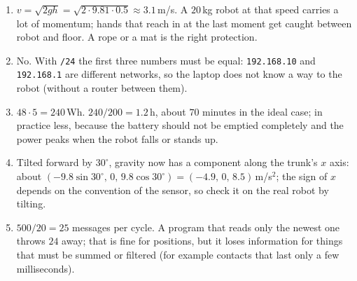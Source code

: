 \begin{enumerate}[label=\textbf{\ansnum.\arabic*}]
  \item $v=\sqrt{2gh}=\sqrt{2\cdot9.81\cdot0.5}\approx3.1$\,m/s. A $20$\,kg robot at that speed carries a lot of momentum; hands that reach in at the last moment get caught between robot and floor. A rope or a mat is the right protection.
  \item No. With \texttt{/24} the first three numbers must be equal: \texttt{192.168.10} and \texttt{192.168.1} are different networks, so the laptop does not know a way to the robot (without a router between them).
  \item $48\cdot5=240$\,Wh. $240/200=1.2$\,h, about $70$ minutes in the ideal case; in practice less, because the battery should not be emptied completely and the power peaks when the robot falls or stands up.
  \item Tilted forward by $30^\circ$, gravity now has a component along the trunk's $x$ axis: about $(-9.8\sin30^\circ,\,0,\,9.8\cos30^\circ)=(-4.9,\,0,\,8.5)$\,m/s$^2$; the sign of $x$ depends on the convention of the sensor, so check it on the real robot by tilting.
  \item $500/20=25$ messages per cycle. A program that reads only the newest one throws $24$ away; that is fine for positions, but it loses information for things that must be summed or filtered (for example contacts that last only a few milliseconds).
\end{enumerate}
